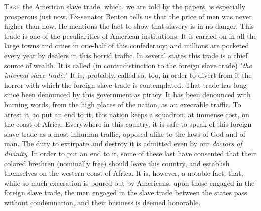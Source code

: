 \textsc{Take} the American slave trade, which, we are told by the
papers, is especially prosperous just now. Ex-senator Benton tells us
that the price of men was never higher than now. He mentions the fact to
show that slavery is in no danger. This trade is one of the
peculiarities of American institutions. It is carried on in all the
large towns and cities in one-half of this confederacy; and millions are
pocketed every year by dealers in this horrid traffic. In several states
this trade is a chief source of wealth. It is called (in
contradistinction to the foreign slave trade) "\emph{the internal slave
trade.}" It is, probably, called so, too, in order to divert from it the
horror with which the foreign slave trade is contemplated. That trade
has long since been denounced by this government as piracy. It has been
denounced with burning words, from the high places of the nation, as an
execrable traffic. To arrest it, to put an end to it, this nation keeps
a squadron, at immense cost, on the coast of Africa. Everywhere in this
country, it is safe to speak of this foreign slave trade as a most
inhuman traffic, opposed alike to the laws of God and of man. The duty
to extirpate and destroy it is admitted even by our \emph{doctors of
divinity}. In order to put an end to it, some of these last have
consented that their colored brethren (nominally free) should leave this
country, and establish themselves on the western coast of Africa. It is,
however, a notable fact, that, while so much execration is poured out by
Americans, upon those engaged in the foreign slave trade, the men
engaged in the slave trade between the states pass without condemnation,
and their business is deemed honorable.

